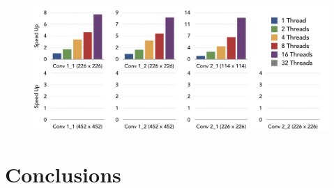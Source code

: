 \documentclass{article}
\begin{document}
\begin{figure}[t]
	\centering
	\includegraphics[width=\textwidth]{scaling}
    \label{fig:scaling}
\end{figure}
\label{sec:eval}

\section{Conclusions}
\label{sec:conclusion}


\nocite{*}
{}
\end{document}
